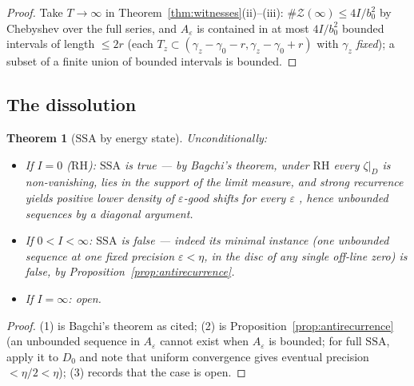 \documentclass[11pt]{amsart}
\theoremstyle{plain}
\newtheorem{theorem}{Theorem}[section]
\theoremstyle{definition}
\theoremstyle{remark}
\newcommand{\RH}{\mathrm{RH}}
\begin{document}
\begin{proof}
Take $T\to\infty$ in Theorem~\ref{thm:witnesses}(ii)--(iii): $\#\mathcal Z(\infty)\le4I/b_0^2$ by Chebyshev over the full series, and $A_\varepsilon$ is contained in at most $4I/b_0^2$ bounded intervals of length $\le2r$ (each $T_z\subset(\gamma_z-\gamma_0-r,\gamma_z-\gamma_0+r)$ with $\gamma_z$ \emph{fixed}); a subset of a finite union of bounded intervals is bounded.
\end{proof}

\subsection{The dissolution}

\begin{theorem}[$\mathrm{SSA}$ by energy state]\label{thm:dissolution}
Unconditionally:
\begin{itemize}
\item[\textup{(1)}] If $I=0$ \textup{(}$\RH$\textup{)}: $\mathrm{SSA}$ is \emph{true} --- by Bagchi's theorem, under $\RH$ every $\zeta|_D$ is non-vanishing, lies in the support of the limit measure, and strong recurrence yields positive lower density of $\varepsilon$-good shifts for every $\varepsilon$ \cite{Bagchi1981,Bagchi1987,Steuding2007}, hence unbounded sequences by a diagonal argument.
\item[\textup{(2)}] If $0<I<\infty$: $\mathrm{SSA}$ is \emph{false} --- indeed its minimal instance \textup{(}one unbounded sequence at one fixed precision $\varepsilon<\eta$, in the disc of any single off-line zero\textup{)} is false, by Proposition~\ref{prop:antirecurrence}.
\item[\textup{(3)}] If $I=\infty$: open.
\end{itemize}
\end{theorem}

\begin{proof}
(1) is Bagchi's theorem as cited; (2) is Proposition~\ref{prop:antirecurrence} (an unbounded sequence in $A_\varepsilon$ cannot exist when $A_\varepsilon$ is bounded; for full $\mathrm{SSA}$, apply it to $D_0$ and note that uniform convergence gives eventual precision $<\eta/2<\eta$); (3) records that the case is open.
\end{proof}
\end{document}
